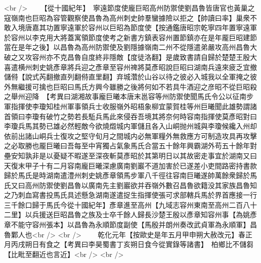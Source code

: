 <br />
　　【從十國紀年】　寧遠節度使龐巨昭高州防禦使劉昌魯皆唐官也黃巢之寇嶺南也巨昭為容管觀察使昌魯為高州刺史帥羣蠻據險以拒之【帥讀曰率】巢衆不敢入境唐嘉其功置寧遠軍於容州以巨昭為節度使【按通鑑唐昭宗乾寧四年置寧遠軍於容州以李克用大將蓋寓領節度使考之新書方鎮表容州置節鎮亦在是年龎巨昭建節當在是年之後】以昌魯為高州防禦使及劉隱據嶺南二州不從隱遣弟嚴攻高州昌魯大破之又攻容州亦不克昌魯自度終非隱敵【度徒洛翻】是歲致書請自歸於楚楚王殷大喜遣横州刺史姚彥章將兵迎之彥章至容州禆將莫彥昭說巨昭曰湖南兵遠來疲乏宜撤儲偫【說式芮翻撤直列翻偫直里翻】弃城濳於山谷以待之彼必入城我以全軍掩之彼外無繼援可擒也巨昭曰馬氏方興今雖勝之後將何如不若具牛酒迎之彦昭不從巨昭殺之舉州迎降　【考異曰湖湘故事龐巨曦本唐末邕容等州防禦使聞馬氏令公以征南步軍指揮使李瓊知桂州軍事領兵士收服嶺外昭梧象柳宜蒙賀桂等州巨曦聞此雄勢謂諸首領曰李瓊有破竹之勢若長駈兵馬此來侵吞吾境其將奈何時容南指揮使莫彥昭對曰李瓊兵馬其勢已雄必然輕敵今欲燒燬城内軍儲且各入山峒抛州城與李瓊候纔入州却依前出諸山峒兵士復攻之堅守旬月之間城内必無軍糧外無救應方可制造攻具再攻擊之必取勝也龎巨曦曰吾每至中宵獨占氣象馬氏合當五十餘年興霸湖外苟五十餘年對壘安知孰非是以憂疑不暇遂至深夜斬莫彥昭於其第明日以其故密走事宜於湖南又曰天復末甲子十有二月容南龐巨曦深慮廣南劉巖不道加害於已遂差小吏間路密持書款歸於馬氏是時湖南遣澧州刺史姚彥章領馬步軍八千徑往容南巨曦遂帥萬餘衆歸於馬氏又曰高州防禦使劉昌魯以廣南先主劉巖欲并吞嶺外數召昌魯欲籍没其家族昌魯知之乃刺血寫書投馬氏具述懸急湖南遂遣捉生指揮使張可求部轄兵馬於界首應接一行三千餘口歸于馬氏今從十國紀年】彥章進至高州【九域志容州東南至高州二百八十二里】以兵援送巨昭昌魯之族及士卒千餘人歸長沙楚王殷以彥章知容州事【為姚彥章不能守容州張本】以昌魯為永順節度副使【馬殷并朗州奏改武貞軍為永順軍】昌魯鄴人也<br />
<br />
　　乾化元年【按歐史是年五月甲申朔大赦改元】春正月丙戌朔日有食之【考異曰李昊蜀書丁亥朔日食今從實錄等諸書】　柏鄉比不儲芻【比毗至翻近也言近】<br />
<br />
